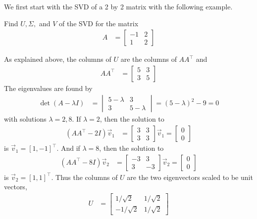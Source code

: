 We first start with the SVD of a 2 by 2 matrix with the following example. 
\begin{example}
Find $U, \Sigma,$ and $V$ of the SVD for the matrix
\begin{align*}
A & = \begin{bmatrix}
-1 & 2 \\
1 & 2 
\end{bmatrix}
\end{align*}

\solution

As explained above, the columns of $U$ are the columns of $AA^{\intercal}$ and 
\begin{align*}
A A^{\intercal} & = \begin{bmatrix}
5 & 3 \\
3 & 5
\end{bmatrix}
\end{align*}
The eigenvalues are found by 
%
\begin{align*}
\det(A-\lambda I) & = \begin{vmatrix}
5 - \lambda & 3 \\ 3 & 5- \lambda 
\end{vmatrix} = (5-\lambda)^2 - 9  = 0
\end{align*}
with solutions $\lambda = 2, 8$.  If $\lambda = 2$, then the solution to 
\begin{align*}
(AA^{\intercal}-2I)\vec{v}_1 & = \begin{bmatrix}
3 & 3 \\ 3 & 3 
\end{bmatrix}\vec{v}_1 = \begin{bmatrix}
0 \\ 0
\end{bmatrix}
\end{align*}
is $\vec{v}_1 = [1,-1]^{\intercal}$.  And if $\lambda = 8$, then the solution to 
\begin{align*}
(AA^{\intercal}-8I) \vec{v}_2 & = \begin{bmatrix}
-3 & 3 \\
3 & -3 
\end{bmatrix} \vec{v}_2  = \begin{bmatrix}
0 \\ 0 
\end{bmatrix}
\end{align*}
is $\vec{v}_2 = [1,1]^{\intercal}$. Thus the columns of $U$ are the two eigenvectors scaled to be unit vectors, 
\begin{align*}
U & = \begin{bmatrix}
1/\sqrt{2} & 1/\sqrt{2} \\
-1/\sqrt{2} & 1/\sqrt{2}
\end{bmatrix}
\end{align*}


\end{example}
